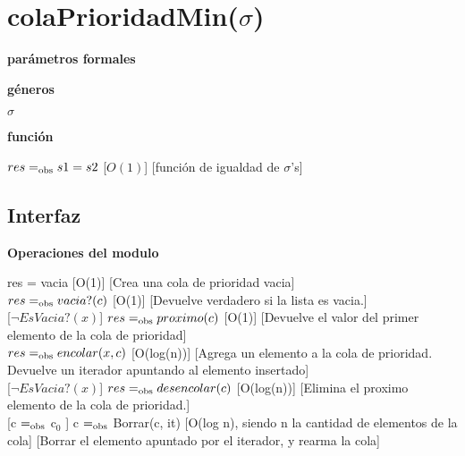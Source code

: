 \section{colaPrioridadMin($\sigma$)}

\textbf{parámetros formales}\parindent\\
\parbox{1.7cm}{\textbf{géneros}}  $\sigma$\\
\parbox[t]{1.7cm}{\textbf{función}}\parbox[t]{\textwidth-2\parindent-1.7cm}{%
{$res =_{\mathrm{obs}} s1 = s2$}
[$O(1)$]
[función de igualdad de $\sigma$'s]
}

\subsection{Interfaz}

\bf{Operaciones del modulo}

{res = vacia}
[O(1)]
[Crea una cola de prioridad vacia]\\

{$res =_{\mathrm{obs}} vacia?(c)$}
[O(1)]
[Devuelve verdadero si la lista es vacia.]\\

[$\neg EsVacia?(x)$]
{$res =_{\mathrm{obs}} proximo(c)$}
[O(1)]
[Devuelve el valor del primer elemento de la cola de prioridad]\\

{$res =_{\mathrm{obs}} encolar(x,c)$}
[O(log(n))]
[Agrega un elemento a la cola de prioridad. Devuelve un iterador apuntando al elemento insertado]\\

[$\neg EsVacia?(x)$]
{$res =_{\mathrm{obs}} desencolar(c)$}
[O(log(n))]
[Elimina el proximo elemento de la cola de prioridad.]\\

[c $=_{\mathrm{obs}}$ c$_0$ ]
{c $=_{\mathrm{obs}}$ Borrar(c, it)}
[O(log n), siendo n la cantidad de elementos de la cola]
[Borrar el elemento apuntado por el iterador, y rearma la cola]\\

